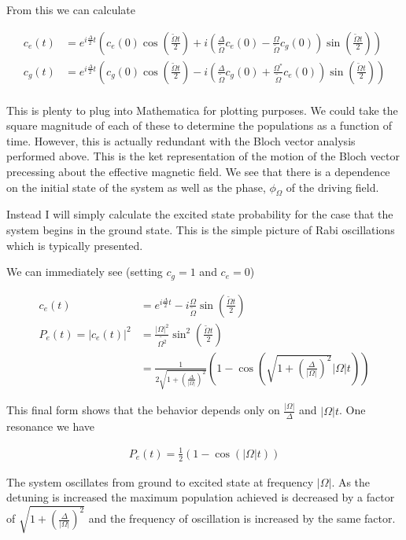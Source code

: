 \documentclass[12pt]{article}
\begin{document}
From this we can calculate

\begin{align}
c_e(t) &= e^{i\frac{\Delta}{2}t}\left(c_e(0) \cos\left(\frac{\tilde{\Omega}t}{2}\right) + i\left(\frac{\Delta}{\tilde{\Omega}}c_e(0) - \frac{\Omega}{\tilde{\Omega}}c_g(0) \right)\sin\left(\frac{\tilde{\Omega}t}{2}\right) \right)\\
c_g(t) &= e^{i\frac{\Delta}{2}t}\left(c_g(0) \cos\left(\frac{\tilde{\Omega}t}{2}\right) - i\left(\frac{\Delta}{\tilde{\Omega}}c_g(0) + \frac{\Omega^*}{\tilde{\Omega}}c_e(0) \right)\sin\left(\frac{\tilde{\Omega}t}{2}\right) \right)\\
\end{align}

This is plenty to plug into Mathematica for plotting purposes. We could take the square magnitude of each of these to determine the populations as a function of time. However, this is actually redundant with the Bloch vector analysis performed above. This is the ket representation of the motion of the Bloch vector precessing about the effective magnetic field. We see that there is a dependence on the initial state of the system as well as the phase, $\phi_{\Omega}$ of the driving field.

Instead I will simply calculate the excited state probability for the case that the system begins in the ground state. This is the simple picture of Rabi oscillations which is typically presented.

We can immediately see (setting $c_g=1$ and $c_e=0$)

\begin{align}
c_e(t) &= e^{i\frac{\Delta}{2}t} -i\frac{\Omega}{\tilde{\Omega}}\sin
\left(\frac{\tilde{\Omega}t}{2}\right)\\
P_e(t) = |c_e(t)|^2 &= \frac{|\Omega|^2}{\tilde{\Omega^2}}\sin^2\left(\frac{\tilde{\Omega}t}{2}\right)\\
&= \frac{1}{2\sqrt{1+\left(\frac{\Delta}{|\Omega|}\right)^2}}\left(1-\cos\left(\sqrt{1+\left(\frac{\Delta}{|\Omega|}\right)^2}|\Omega| t\right) \right)
\end{align}

This final form shows that the behavior depends only on $\frac{|\Omega|}{\Delta}$ and $|\Omega| t$. One resonance we have

\begin{align}
P_e(t) = \frac{1}{2}\left(1-\cos\left(|\Omega| t\right)\right)
\end{align}

The system oscillates from ground to excited state at frequency $|\Omega|$. As the detuning is increased the maximum population achieved is decreased by a factor of $\sqrt{1+\left(\frac{\Delta}{|\Omega|}\right)^2}$ and the frequency of oscillation is increased by the same factor.
\end{document}
